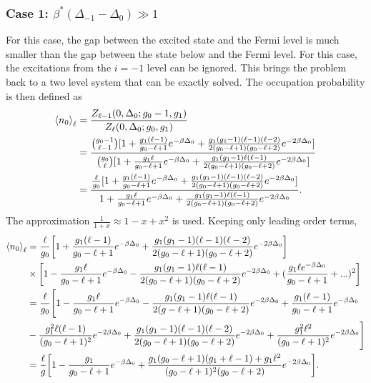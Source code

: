 \subsubsection{Case 1: $\beta^*(\Delta_{-1}-\Delta_0)\gg 1$} \label{case1}
For this case, the gap between the excited state and the Fermi level is much smaller than the gap between the state below and the Fermi level. For this case, the excitations from the $i=-1$ level can be ignored. This brings the problem back to a two level system that can be exactly solved. The occupation probability is then defined as
\begin{align}
    \left<{n_0}\right>_\ell&=\frac{Z_{\ell-1}(0,\Delta_0;g_0-1,g_1)}{Z_\ell(0,\Delta_0;g_0,g_1)}\nonumber\\
    &=\frac{{g_0-1\choose \ell-1}[1+\frac{g_1(\ell-1)}{g_0-\ell+1}e^{-\beta\Delta_0} +\frac{g_1(g_1-1)(\ell-1)(\ell-2)}{2(g_0-\ell+1)(g_0-\ell+2)}e^{-2\beta\Delta_0}]}{{g_0\choose \ell}[1+\frac{g_1 \ell}{g_0-\ell+1}e^{-\beta\Delta_0} +\frac{g_1(g_1-1)\ell(\ell-1)}{2(g_0-\ell+1)(g_0-\ell+2)}e^{-2\beta\Delta_0}]}\nonumber\\
    &=\frac{\frac{\ell}{g_0} [1+\frac{g_1(\ell-1)}{g_0-\ell+1}e^{-\beta\Delta_0} +\frac{g_1(g_1-1)(\ell-1)(\ell-2)}{2(g_0-\ell+1)(g_0-\ell+2)}e^{-2\beta\Delta_0}]}{1+\frac{g_1 \ell}{g_0-\ell+1}e^{-\beta\Delta_0} +\frac{g_1(g_1-1)\ell(\ell-1)}{2(g_0-\ell+1)(g_0-\ell+2)}e^{-2\beta\Delta_0}}.
\end{align}
The approximation $\frac{1}{1+x}\approx 1-x+x^2$ is used. Keeping only leading order terms,
\begin{align}
    \left<{n_0}\right>_\ell&=\frac{\ell}{g_0}\qty[1+\frac{g_1(\ell-1)}{g_0-\ell+1}e^{-\beta\Delta_0} +\frac{g_1(g_1-1)(\ell-1)(\ell-2)}{2(g_0-\ell+1)(g_0-\ell+2)}e^{-2\beta\Delta_0}]\nonumber\\
    &\times \qty[1-\frac{g_1\ell}{g_0-\ell+1}e^{-\beta\Delta_0}-\frac{g_1(g_1-1)\ell(\ell-1)}{2(g_0-\ell+1)(g_0-\ell+2)}e^{-2\beta\Delta_0}+(\frac{g_1 \ell e^{-\beta\Delta_0}}{g_0-\ell+1}+...)^2] \nonumber\\
    &=\frac{\ell}{g_0}\Biggr[1-\frac{g_1\ell}{g_0-\ell+1}e^{-\beta\Delta_0}-\frac{g_1(g_1-1)\ell(\ell-1)}{2(g-\ell+1)(g_0-\ell+2)}e^{-2\beta\Delta_0}+\frac{g_1(\ell-1)}{g_0-\ell+1}e^{-\beta\Delta_0}\nonumber\\
    &-\frac{g_1^2 \ell(\ell-1)}{(g_0-\ell+1)^2}e^{-2\beta\Delta_0}+\frac{g_1(g_1-1)(\ell-1)(\ell-2)}{2(g_0-\ell+1)(g_0-\ell+2)}e^{-2\beta\Delta_0}+\frac{g_1^2\ell^2}{(g_0-\ell+1)^2}e^{-2\beta\Delta_0}\Biggr]\nonumber\\
    &=\frac{\ell}{g}\qty[1-\frac{g_1}{g_0-\ell+1}e^{-\beta\Delta_0}+\frac{g_1(g_0-\ell+1)(g_1+\ell-1)+g_1\ell^2}{(g_0-\ell+1)^2(g_0-\ell+2)}e^{-2\beta\Delta_0}]. \label{2.39}
\end{align}          
